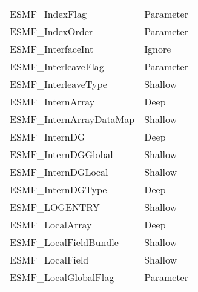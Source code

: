 \begin{table}[t]
\begin{tabular}{ll}
ESMF\_IndexFlag             & Parameter \\
ESMF\_IndexOrder            & Parameter \\
ESMF\_InterfaceInt          & Ignore\\
ESMF\_InterleaveFlag        & Parameter \\
ESMF\_InterleaveType        & Shallow\\
ESMF\_InternArray           & Deep \\
ESMF\_InternArrayDataMap    & Shallow\\
ESMF\_InternDG              & Deep \\
ESMF\_InternDGGlobal        & Shallow\\
ESMF\_InternDGLocal         & Shallow\\
ESMF\_InternDGType          & Deep \\
ESMF\_LOGENTRY              & Shallow\\
ESMF\_LocalArray            & Deep \\
ESMF\_LocalFieldBundle           & Shallow\\
ESMF\_LocalField            & Shallow\\
ESMF\_LocalGlobalFlag       & Parameter \\ 

\end{tabular}
\end{table}

